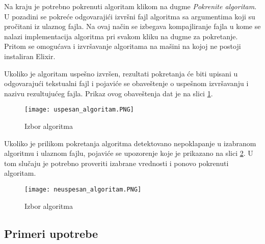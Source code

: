 \documentclass[12pt,oneside]{memoir}
\begin{document}
Na kraju je potrebno pokrenuti algoritam klikom na dugme \textit{Pokrenite algoritam}. U pozadini se pokreće odgovarajići izvršni fajl algoritma sa argumentima koji su pročitani iz ulaznog fajla. Na ovaj način se izbegava kompajliranje fajla u kome se nalazi implementacija algoritma pri svakom kliku na dugme za pokretanje. Pritom se omogućava i izvršavanje algoritama na mašini na kojoj ne postoji instaliran Elixir.

Ukoliko je algoritam uspešno izvršen, rezultati pokretanja će biti upisani u odgovarajući tekstualni fajl i pojaviće se obaveštenje o uspešnom izvršavanju i nazivu rezultujućeg fajla. Prikaz ovog obaveštenja dat je na slici \ref{fig:uspesnoIzvrsavanje}.




\begin{figure}[h]
\centering
\texttt{[image: uspesan\_algoritam.PNG]}
\caption{Izbor algoritma}
\label{fig:uspesnoIzvrsavanje}
\end{figure}

Ukoliko je prilikom pokretanja algoritma detektovano nepoklapanje u izabranom algoritmu i ulaznom fajlu, pojaviće se upozorenje koje je prikazano na slici \ref{fig:neuspesnoIzvrsavanje}. U tom slučaju je potrebno proveriti izabrane vrednosti i ponovo pokrenuti algoritam.

\begin{figure}[h]
\centering
\texttt{[image: neuspesan\_algoritam.PNG]}
\caption{Izbor algoritma}
\label{fig:neuspesnoIzvrsavanje}
\end{figure}

\newpage

\subsection{Primeri upotrebe}
\end{document}
